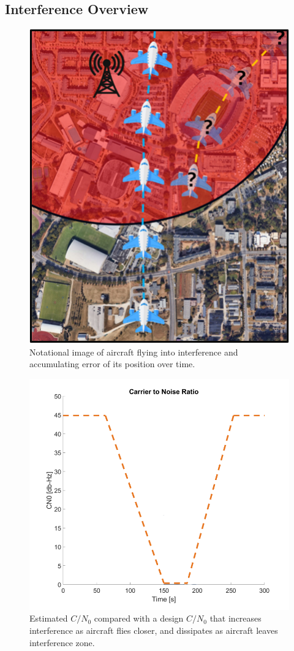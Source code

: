 \subsection{\textbf{Interference Overview}}

\begin{figure}[!ht]
    \centering
    \includegraphics[width=0.75\linewidth]{Figures/notationalinterference.png}
    \caption{Notational image of aircraft flying into interference and accumulating error of its position over time.}\label{fig:notationalinterference}
\end{figure}

\begin{figure}[!ht]
    \centering
    \includegraphics[width=0.75\linewidth]{Figures/Results/CN0scene2.png}
    \caption{Estimated \(C/N_0\) compared with a design \(C/N_0\) that increases interference as aircraft flies closer, and dissipates as aircraft leaves interference zone. }\label{fig:CN0scene2}
\end{figure}

